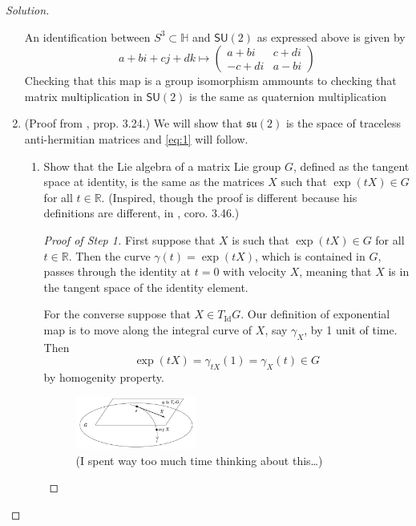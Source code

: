 \begin{proof}[Solution]
\begin{enumerate}[label=\alph*.]
			An identification between $S^3\subset \mathbb{H}$ and $\mathsf{SU}(2)$ as expressed above is given by
			\[a+bi+cj+dk\longmapsto \begin{pmatrix} a+bi&c+di\\-c+di&a-bi\end{pmatrix} \]
			Checking that this map is a group isomorphism ammounts to checking that matrix multiplication in $\mathsf{SU}(2)$ is the same as quaternion multiplication 


			\item (Proof from \cite{hall}, prop. 3.24.) We will show that $\mathfrak{su}(2)$ is the space of traceless anti-hermitian matrices and \cref{eq:1} will follow.
				\begin{enumerate}[label=\textbf{Step \arabic*}]
					\item Show that the Lie algebra of a matrix Lie group $G$, defined as the tangent space at identity, is the same as the matrices $X$ such that $ \operatorname{exp}(tX) \in G$ for all $t\in\mathbb{R}$. (Inspired, though the proof is different because his definitions are different, in \cite{hall}, coro. 3.46.)

						\begin{proof}[Proof of Step 1]\leavevmode
							First suppose that $X$ is such that $\operatorname{exp}(tX)\in G$ for all $t\in\mathbb{R}$. Then the curve $\gamma(t)=\operatorname{exp}(tX)$, which is contained in $G$, passes through the identity at $t=0$ with velocity $X$, meaning that $X$ is in the tangent space of the identity element.

							For the converse suppose that $X \in T_{\operatorname{Id}}G$. Our definition of exponential map is to move along the integral curve of $X$, say $\gamma_X$, by 1 unit of time. Then
							\[\operatorname{exp}(tX) =\gamma_{tX}(1)=\gamma_X(t)\in G\]
							by homogenity property.

	\begin{figure}[H]		\centering
		\includegraphics[width=0.4\textwidth]{fig2}	
	\caption*{(I spent way too much time thinking about this…)}\end{figure}


\end{proof}
\end{enumerate}
\end{enumerate}
\end{proof}
